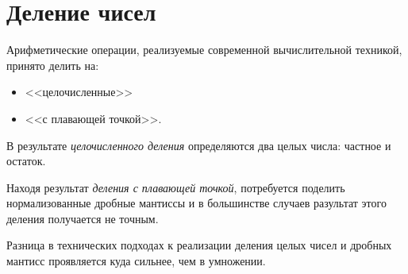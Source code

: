 \chapter{Деление чисел}
\label{ch:div}


Арифметические операции, реализуемые современной вычислительной техникой, принято делить на:
\begin{itemize}
    \item <<целочисленные>>
    \item <<с плавающей точкой>>.
\end{itemize}

В результате \emph{целочисленного деления} определяются два целых числа: частное и остаток.

Находя результат \emph{деления с плавающей точкой}, потребуется поделить нормализованные дробные мантиссы и в большинстве случаев разультат этого деления получается не точным.

Разница в технических подходах к реализации деления целых чисел и дробных мантисс проявляется куда сильнее, чем в умножении.


